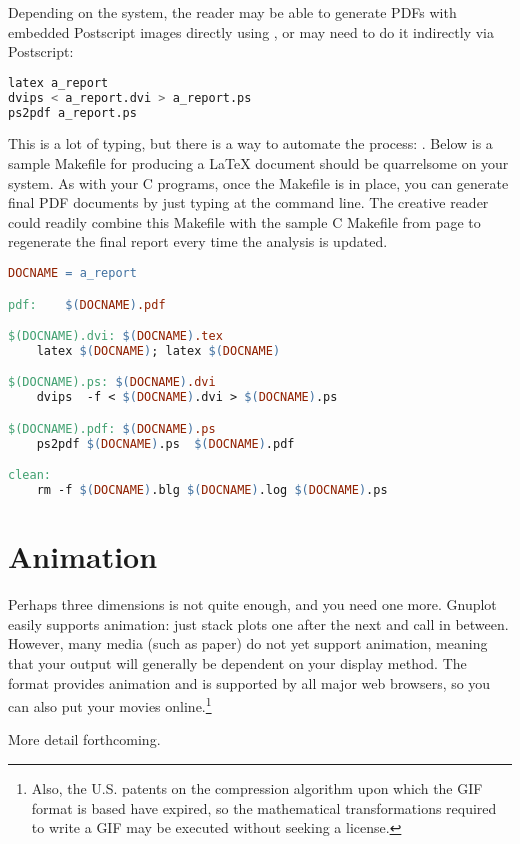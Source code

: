 Depending on the system, the reader may be able to generate PDFs with
embedded Postscript images directly using , or may
need to do it indirectly via Postscript: 
\begin{lstlisting}[language=sql]
latex a_report
dvips < a_report.dvi > a_report.ps
ps2pdf a_report.ps
\end{lstlisting}

This is a lot of typing, but there is a way to automate the process:
. Below is a sample Makefile for producing a \LaTeX{} document
should  be quarrelsome on your system. As with your C
programs, once the Makefile is in place, you can generate final PDF
documents by just typing  at the command line. The
creative reader could readily combine this Makefile with the sample C
Makefile from page \pageref{make} to regenerate the final report every
time the analysis is updated.

\begin{lstlisting}[language=make]
DOCNAME = a_report

pdf:	$(DOCNAME).pdf

$(DOCNAME).dvi: $(DOCNAME).tex
	latex $(DOCNAME); latex $(DOCNAME)

$(DOCNAME).ps: $(DOCNAME).dvi
	dvips  -f < $(DOCNAME).dvi > $(DOCNAME).ps

$(DOCNAME).pdf: $(DOCNAME).ps
	ps2pdf $(DOCNAME).ps  $(DOCNAME).pdf

clean:
	rm -f $(DOCNAME).blg $(DOCNAME).log $(DOCNAME).ps
\end{lstlisting}

\section{Animation} Perhaps three dimensions is not
quite enough, and you need one more. Gnuplot easily supports animation:
just stack plots one after the next and call  in between. However,
many media (such as paper) do not yet support animation, meaning that your
output will generally be dependent on your display method. The  format
provides animation and is supported by all major web browsers, so you
can also put your movies online.\footnote{Also, the U.S. patents on the
compression algorithm upon which the GIF format is based \citep{welch:lzw}
have expired, so the mathematical transformations required to write a
GIF may be executed without seeking a license.}

More detail forthcoming.


